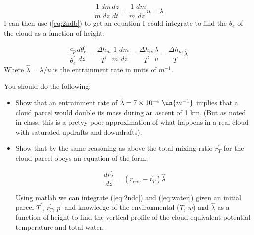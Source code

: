 \documentclass[12pt]{article}
\begin{document}
\begin{equation}
  \label{eq:plume2}
  \frac{1}{m} \frac{dm}{dz} \frac{dz}{dt} = \frac{1}{m} \frac{dm}{dz} u = \lambda
\end{equation}
I can then use (\ref{eq:2ndb}) to get an equation I could integrate to
find the $\theta_e$ of the cloud as a function of height:


\begin{equation}
  \label{eq:2ndc}
 \frac{c_p}{\theta_e^\prime} \frac{d\theta_e^\prime}{dz} = 
         \frac{\Delta h_m}{T^\prime} \frac{1}{m}\frac{dm}{dz} = 
   \frac{\Delta h_m}{T^\prime} \frac{\lambda}{u} =
  \frac{\Delta h_m}{T^\prime} \hat{\lambda}
\end{equation}
Where $\hat{\lambda} = \lambda/u$ is the entrainment rate
in units of $m^{-1}$.

You should do the following:

\begin{itemize}
\item Show that an entrainment rate of $\hat{\lambda}= 7 \times
  10^{-4}\ \un{m^{-1}}$ implies that a cloud parcel would double its
  mass during an ascent of 1 km.  (But as noted in class, this
is a pretyy poor approximation of what happens in a real cloud with
saturated updrafts and downdrafts).

\item Show that by the same reasoning as above the total mixing ratio $r_T^\prime$
for the cloud parcel obeys an equation of the form:

\begin{equation}
  \label{eq:water}
  \frac{dr_T^\prime}{dz} = (r_{env} - r_T^\prime) \hat{\lambda}
\end{equation}

Using matlab we can integrate (\ref{eq:2ndc}) and (\ref{eq:water})
given an initial parcel $T^\prime,\, r_T^\prime,\, p^\prime$ and 
knowledge of the environmental ($T,\,w$) and $\hat{\lambda}$ as a
function of height to find the vertical profile of the cloud
equivalent potential temperature and total water.

\end{itemize}
\end{document}
